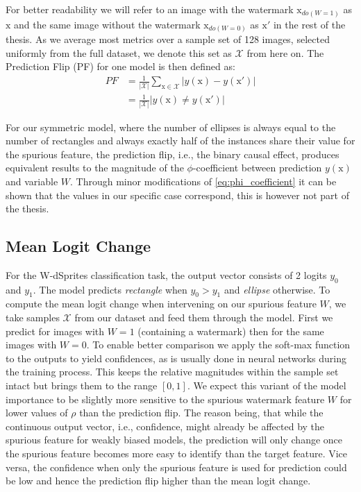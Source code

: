 For better readability we will refer to an image with the watermark $\mathrm{x}_{do(W=1)}$ as $\mathrm{x}$ and the same image without the watermark $\mathrm{x}_{do(W=0)}$ as $\mathrm{x'}$ in the rest of the thesis. As we average most metrics over a sample set of 128 images, selected uniformly from the full dataset, we denote this set as $\mathcal{X}$ from here on. The Prediction Flip (PF) for one model is then defined as:
\begin{align}
\displaystyle 
PF &=\tfrac{1}{|\mathcal{X}|} \sum_{\mathrm{x} \in \mathcal{X}} |y(\mathrm{x}) - y(\mathrm{x'}) | \\
 &= \tfrac{1}{|\mathcal{X}|} |y(\mathrm{x}) \neq y(\mathrm{x'})| 
\end{align}

For our symmetric model, where the number of ellipses is always equal to the number of rectangles and always exactly half of the instances share their value for the spurious feature, the prediction flip, i.e., the binary causal effect, produces equivalent results to the magnitude of the $\phi$-coefficient between prediction $y(\mathrm{x})$ and variable $W$. Through minor modifications of \cref{eq:phi_coefficient} it can be shown that the values in our specific case correspond, this is however not part of the thesis.  

\subsection{Mean Logit Change}
For the W-dSprites classification task, the output vector consists of 2 logits $y_0$ and $y_1$. The model predicts \textit{rectangle} when $y_0 > y_1$ and \textit{ellipse} otherwise. To compute the mean logit change when intervening on our spurious feature $W$, we take samples $\mathcal{X}$ from our dataset and feed them through the model. First we predict for images with $W=1$ (containing a watermark) then for the same images with $W=0$. 
To enable better comparison we apply the soft-max function to the outputs to yield confidences, as is usually done in neural networks during the training process. This keeps the relative magnitudes within the sample set intact but brings them to the range $[0,1]$. 
We expect this variant of the model importance to be slightly more sensitive to the spurious watermark feature $W$ for lower values of $\rho$ than the prediction flip. The reason being, that while the continuous output vector, i.e., confidence, might already be affected by the spurious feature for weakly biased models, the prediction will only change once the spurious feature becomes more easy to identify than the target feature. Vice versa, the confidence when only the spurious feature is used for prediction could be low and hence the prediction flip higher than the mean logit change.

